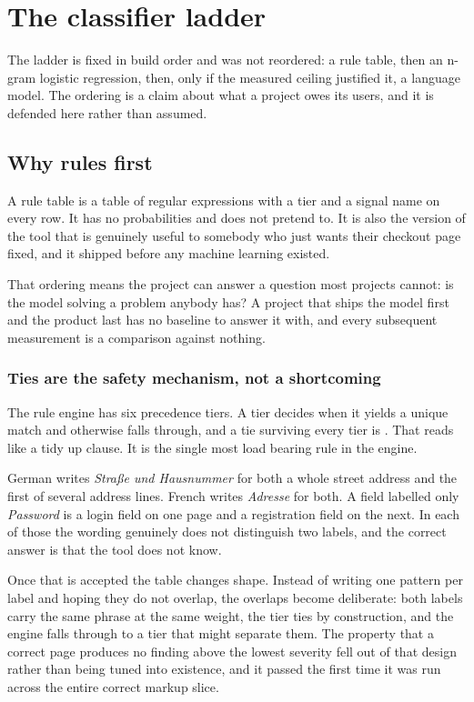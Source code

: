 \chapter{The classifier ladder}
\label{ch:classifiers}

The ladder is fixed in build order and was not reordered: a rule table, then an
n-gram logistic regression, then, only if the measured ceiling justified it, a
language model. The ordering is a claim about what a project owes its users, and
it is defended here rather than assumed.

\section{Why rules first}

A rule table is a table of regular expressions with a tier and a signal name on
every row. It has no probabilities and does not pretend to. It is also the
version of the tool that is genuinely useful to somebody who just wants their
checkout page fixed, and it shipped before any machine learning existed.

That ordering means the project can answer a question most projects cannot: is
the model solving a problem anybody has? A project that ships the model first
and the product last has no baseline to answer it with, and every subsequent
measurement is a comparison against nothing.

\subsection{Ties are the safety mechanism, not a shortcoming}

The rule engine has six precedence tiers. A tier decides when it yields a unique
match and otherwise falls through, and a tie surviving every tier is
. That reads like a tidy up clause. It is the single most load
bearing rule in the engine.

German writes \emph{Stra\ss{}e und Hausnummer} for both a whole street address
and the first of several address lines. French writes \emph{Adresse} for both. A
field labelled only \emph{Password} is a login field on one page and a
registration field on the next. In each of those the wording genuinely does not
distinguish two labels, and the correct answer is that the tool does not know.

Once that is accepted the table changes shape. Instead of writing one pattern
per label and hoping they do not overlap, the overlaps become deliberate: both
labels carry the same phrase at the same weight, the tier ties by construction,
and the engine falls through to a tier that might separate them. The property
that a correct page produces no finding above the lowest severity fell out of
that design rather than being tuned into existence, and it passed the first time
it was run across the entire correct markup slice.

